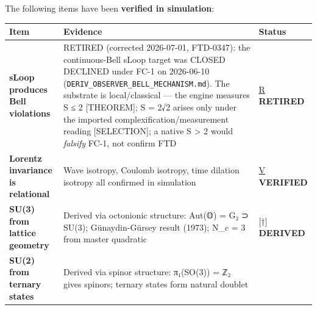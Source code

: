 \documentclass[
  11pt,
  letterpaper,
  twoside,
  openany]{book}
\begin{document}
\begin{tcolorbox}[enhanced jigsaw, colbacktitle=quarto-callout-tip-color!10!white, titlerule=0mm, bottomtitle=1mm, bottomrule=.15mm, colback=white, arc=.35mm, breakable, toprule=.15mm, title=\textcolor{quarto-callout-tip-color}{\faLightbulb}\hspace{0.5em}{Verified in Simulation}, rightrule=.15mm, coltitle=black, leftrule=.75mm, colframe=quarto-callout-tip-color-frame, toptitle=1mm, opacityback=0, opacitybacktitle=0.6, left=2mm]

The following items have been \textbf{verified in simulation}:

\begin{longtable}[]{@{}
  >{\raggedright\arraybackslash}p{}
  >{\raggedright\arraybackslash}p{}
  >{\raggedright\arraybackslash}p{}@{}}
\toprule\noalign{}
\begin{minipage}[b]{\linewidth}\raggedright
Item
\end{minipage} & \begin{minipage}[b]{\linewidth}\raggedright
Evidence
\end{minipage} & \begin{minipage}[b]{\linewidth}\raggedright
Status
\end{minipage} \\
\midrule\noalign{}
\endhead
\bottomrule\noalign{}
\endlastfoot
\textbf{sLoop produces Bell violations} & RETIRED (corrected 2026-07-01,
FTD-0347): the continuous-Bell sLoop target was CLOSED DECLINED under
FC-1 on 2026-06-10 (\texttt{DERIV\_OBSERVER\_BELL\_MECHANISM.md}). The
substrate is local/classical --- the engine measures S ≤ 2
{[}THEOREM{]}; S = 2√2 arises only under the imported
complexification/measurement reading {[}SELECTION{]}; a native S
\textgreater{} 2 would \emph{falsify} FC-1, not confirm FTD &
\hyperref[r]{R} \textbf{RETIRED} \\
\textbf{Lorentz invariance is relational} & Wave isotropy, Coulomb
isotropy, time dilation isotropy all confirmed in simulation &
\hyperref[v]{V} \textbf{VERIFIED} \\
\textbf{SU(3) from lattice geometry} & Derived via octonionic structure:
Aut(𝕆) = G₂ ⊃ SU(3); Günaydin-Gürsey result (1973); N\_c = 3 from master
quadratic & {[}†{]} \textbf{DERIVED} \\
\textbf{SU(2) from ternary states} & Derived via spinor structure:
π₁(SO(3)) = ℤ₂ gives spinors; ternary states form natural doublet &

\end{longtable}
\end{tcolorbox}
\end{document}
